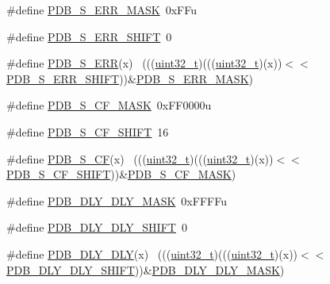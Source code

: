 \begin{DoxyCompactItemize}
\item 
\#define \hyperlink{group___p_d_b___register___masks_ga544472023dc6de6708b210d54d64c69c}{P\+D\+B\+\_\+\+S\+\_\+\+E\+R\+R\+\_\+\+M\+A\+SK}~0x\+F\+Fu
\item 
\#define \hyperlink{group___p_d_b___register___masks_ga3b10142858bded9ff7916076433dbcb6}{P\+D\+B\+\_\+\+S\+\_\+\+E\+R\+R\+\_\+\+S\+H\+I\+FT}~0
\item 
\#define \hyperlink{group___p_d_b___register___masks_ga52caf9f629d2d46073999f760e575cf5}{P\+D\+B\+\_\+\+S\+\_\+\+E\+RR}(x)                                                      ~(((\hyperlink{_p_e___types_8h_a33594304e786b158f3fb30289278f5af}{uint32\+\_\+t})(((\hyperlink{_p_e___types_8h_a33594304e786b158f3fb30289278f5af}{uint32\+\_\+t})(x))$<$$<$\hyperlink{group___p_d_b___register___masks_ga3b10142858bded9ff7916076433dbcb6}{P\+D\+B\+\_\+\+S\+\_\+\+E\+R\+R\+\_\+\+S\+H\+I\+FT}))\&\hyperlink{group___p_d_b___register___masks_ga544472023dc6de6708b210d54d64c69c}{P\+D\+B\+\_\+\+S\+\_\+\+E\+R\+R\+\_\+\+M\+A\+SK})
\item 
\#define \hyperlink{group___p_d_b___register___masks_gabf6ae593f200a1eda316cd9affa9f5b2}{P\+D\+B\+\_\+\+S\+\_\+\+C\+F\+\_\+\+M\+A\+SK}~0x\+F\+F0000u
\item 
\#define \hyperlink{group___p_d_b___register___masks_ga17f0097777c1377488f0bf9654021714}{P\+D\+B\+\_\+\+S\+\_\+\+C\+F\+\_\+\+S\+H\+I\+FT}~16
\item 
\#define \hyperlink{group___p_d_b___register___masks_gaa5b47758d8c9843160a413bbb6f63bc5}{P\+D\+B\+\_\+\+S\+\_\+\+CF}(x)                                                        ~(((\hyperlink{_p_e___types_8h_a33594304e786b158f3fb30289278f5af}{uint32\+\_\+t})(((\hyperlink{_p_e___types_8h_a33594304e786b158f3fb30289278f5af}{uint32\+\_\+t})(x))$<$$<$\hyperlink{group___p_d_b___register___masks_ga17f0097777c1377488f0bf9654021714}{P\+D\+B\+\_\+\+S\+\_\+\+C\+F\+\_\+\+S\+H\+I\+FT}))\&\hyperlink{group___p_d_b___register___masks_gabf6ae593f200a1eda316cd9affa9f5b2}{P\+D\+B\+\_\+\+S\+\_\+\+C\+F\+\_\+\+M\+A\+SK})
\item 
\#define \hyperlink{group___p_d_b___register___masks_ga79150887ba3f74efde99b40d3b9c5e44}{P\+D\+B\+\_\+\+D\+L\+Y\+\_\+\+D\+L\+Y\+\_\+\+M\+A\+SK}~0x\+F\+F\+F\+Fu
\item 
\#define \hyperlink{group___p_d_b___register___masks_ga431302f6c6fd1396cbb05844f864d241}{P\+D\+B\+\_\+\+D\+L\+Y\+\_\+\+D\+L\+Y\+\_\+\+S\+H\+I\+FT}~0
\item 
\#define \hyperlink{group___p_d_b___register___masks_ga15b6cdd6062cf0c5d1470da97faebb22}{P\+D\+B\+\_\+\+D\+L\+Y\+\_\+\+D\+LY}(x)                                                  ~(((\hyperlink{_p_e___types_8h_a33594304e786b158f3fb30289278f5af}{uint32\+\_\+t})(((\hyperlink{_p_e___types_8h_a33594304e786b158f3fb30289278f5af}{uint32\+\_\+t})(x))$<$$<$\hyperlink{group___p_d_b___register___masks_ga431302f6c6fd1396cbb05844f864d241}{P\+D\+B\+\_\+\+D\+L\+Y\+\_\+\+D\+L\+Y\+\_\+\+S\+H\+I\+FT}))\&\hyperlink{group___p_d_b___register___masks_ga79150887ba3f74efde99b40d3b9c5e44}{P\+D\+B\+\_\+\+D\+L\+Y\+\_\+\+D\+L\+Y\+\_\+\+M\+A\+SK})
$$
\end{DoxyCompactItemize}

